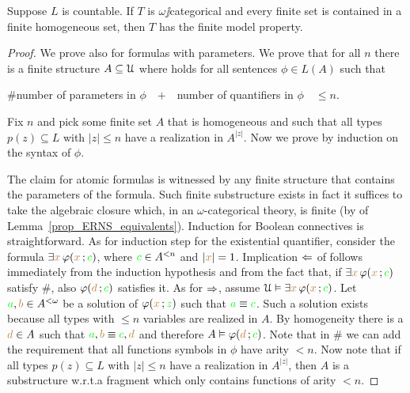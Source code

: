 \documentclass[creche.tex]{subfiles}
\begin{document}
\begin{lemma}\label{lem_zilbergiocattolo} Suppose $L$ is countable.
If $T$ is $\omega\jj$categorical and every finite set is contained in a finite homogeneous set, then $T$ has the finite model property.
\end{lemma}
\begin{proof}

We prove  also for formulas with parameters.
We prove that for all $n$ there is a finite structure $A\subseteq\EuScript U$ where  holds for all sentences $\phi\in L(A)$ such that

$\#$\hfil number of parameters in $\phi$\ \  $+$\ \  number of quantifiers in $\phi$\ \ $\le n$.

Fix $n$ and pick some finite set $A$ that is homogeneous and such that all types $p(z)\subseteq L$ with $|z|\le n$ have a realization in $A^{|z|}$.
Now we prove  by induction on the syntax of $\phi$.

The claim for atomic formulas is witnessed by any finite structure that contains the parameters of the formula.
Such finite substructure exists in fact it suffices to take the algebraic closure which, in an $\omega$-categorical theory, is finite (by  of Lemma~\ref{prop_ERNS_equivalents}).
Induction for Boolean connectives is straightforward.
As for induction step for the existential quantifier, consider the formula $\exists {\color{brown}x}\,\varphi({\color{brown} x}\,;{\color{green} c})$, where ${\color{green} c}\in A^{<n}$ and $|{\color{brown} x}|=1$.
Implication $\Leftarrow$ of  follows immediately from the induction hypothesis and from the fact that, if $\exists {\color{brown}x}\,\varphi({\color{brown} x}\,;{\color{green} c})$ satisfy $\#$, also $\varphi({\color{brown} d}\,;{\color{green} c})$ satisfies it.
As for $\Rightarrow$, assume $\EuScript U\vDash\exists {\color{brown}x}\, \varphi({\color{brown} x}\,;{\color{green} c})$.
Let ${\color{green} a},{\color{brown} b}\in A^{<\omega}$ be a solution of $\varphi({\color{brown} x}\,;{\color{green} z})$ such that ${\color{green} a}\equiv{\color{green}c}$.
Such a solution exists because all types with $\le n$ variables are realized in $A$.
By homogeneity there is a ${\color{brown} d}\in A$ such that ${\color{green} a},{\color{brown} b}\equiv {\color{green}c},{\color{brown} d}$ and therefore $A\vDash\varphi({\color{brown} d}\,;{\color{green} c})$.
%
Note that in $\#$ we can add the requirement that all functions symbols in $\phi$ have arity $< n$.
Now note that if all types $p(z)\subseteq L$ with $|z|\le n$ have a realization in $A^{|z|}$, then $A$ is a substructure w.r.t.\@ a fragment which only contains functions of arity $< n$.
\end{proof}
\end{document}
